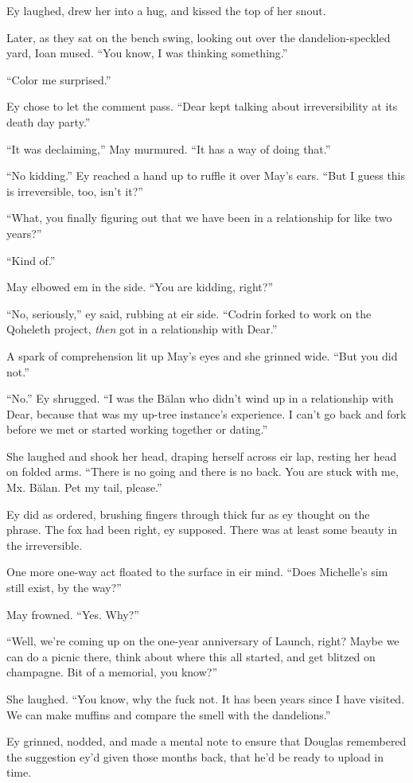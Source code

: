 Ey laughed, drew her into a hug, and kissed the top of her snout.

Later, as they sat on the bench swing, looking out over the dandelion-speckled yard, Ioan mused. ``You know, I was thinking something.''

``Color me surprised.''

Ey chose to let the comment pass. ``Dear kept talking about irreversibility at its death day party.''

``It was declaiming,'' May murmured. ``It has a way of doing that.''

``No kidding.'' Ey reached a hand up to ruffle it over May's ears. ``But I guess this is irreversible, too, isn't it?''

``What, you finally figuring out that we have been in a relationship for like two years?''

``Kind of.''

May elbowed em in the side. ``You are kidding, right?''

``No, seriously,'' ey said, rubbing at eir side. ``Codrin forked to work on the Qoheleth project, \emph{then} got in a relationship with Dear.''

A spark of comprehension lit up May's eyes and she grinned wide. ``But you did not.''

``No.'' Ey shrugged. ``I was the Bălan who didn't wind up in a relationship with Dear, because that was my up-tree instance's experience. I can't go back and fork before we met or started working together or dating.''

She laughed and shook her head, draping herself across eir lap, resting her head on folded arms. ``There is no going and there is no back. You are stuck with me, Mx. Bălan. Pet my tail, please.''

Ey did as ordered, brushing fingers through thick fur as ey thought on the phrase. The fox had been right, ey supposed. There was at least some beauty in the irreversible.

One more one-way act floated to the surface in eir mind. ``Does Michelle's sim still exist, by the way?''

May frowned. ``Yes. Why?''

``Well, we're coming up on the one-year anniversary of Launch, right? Maybe we can do a picnic there, think about where this all started, and get blitzed on champagne. Bit of a memorial, you know?''

She laughed. ``You know, why the fuck not. It has been years since I have visited. We can make muffins and compare the smell with the dandelions.''

Ey grinned, nodded, and made a mental note to ensure that Douglas remembered the suggestion ey'd given those months back, that he'd be ready to upload in time.
